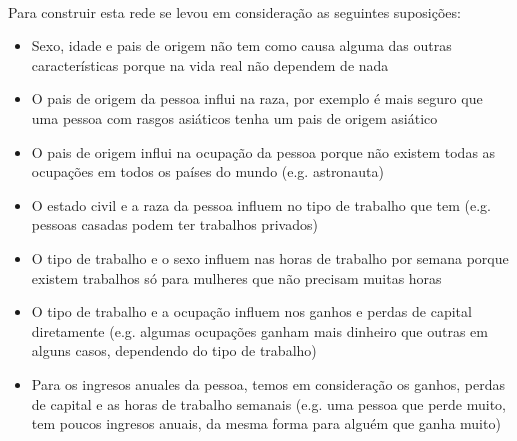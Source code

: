 	\\
	Para construir esta rede se levou em consideração as seguintes suposições:
	\begin{itemize}
		\item Sexo, idade e pais de origem não tem como causa alguma das outras características porque na vida real não dependem de nada
		\item O pais de origem da pessoa influi na raza, por exemplo é mais seguro que uma pessoa com rasgos asiáticos tenha um pais de origem asiático
		\item O pais de origem influi na ocupação da pessoa porque não existem todas as ocupações em todos os países do mundo (e.g. astronauta)
		\item O estado civil e a raza da pessoa influem no tipo de trabalho que tem (e.g. pessoas casadas podem ter trabalhos privados)
		\item O tipo de trabalho e o sexo influem nas horas de trabalho por semana porque existem trabalhos só para mulheres que não precisam muitas horas
		\item O tipo de trabalho e a ocupação influem nos ganhos e perdas de capital diretamente (e.g. algumas ocupações ganham mais dinheiro que outras em alguns casos, dependendo do tipo de trabalho)
		\item Para os ingresos anuales da pessoa, temos em consideração os ganhos, perdas de capital e as horas de trabalho semanais (e.g. uma pessoa que perde muito, tem poucos ingresos anuais, da mesma forma para alguém que ganha muito)
	\end{itemize}
	

